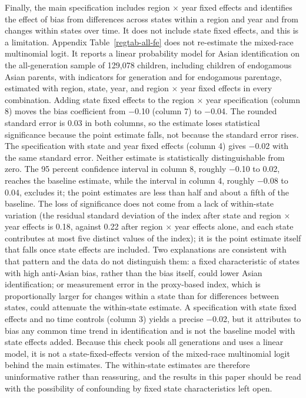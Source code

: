 Finally, the main specification includes region $\times$ year fixed effects and identifies the effect of bias from differences across states within a region and year and from changes within states over time. It does not include state fixed effects, and this is a limitation. Appendix Table~\ref{regtab-all-fe} does not re-estimate the mixed-race multinomial logit. It reports a linear probability model for Asian identification on the all-generation sample of 129{,}078 children, including children of endogamous Asian parents, with indicators for generation and for endogamous parentage, estimated with region, state, year, and region $\times$ year fixed effects in every combination. Adding state fixed effects to the region $\times$ year specification (column 8) moves the bias coefficient from $-$0.10 (column 7) to $-$0.04. The rounded standard error is 0.03 in both columns, so the estimate loses statistical significance because the point estimate falls, not because the standard error rises. The specification with state and year fixed effects (column 4) gives $-$0.02 with the same standard error. Neither estimate is statistically distinguishable from zero. The 95 percent confidence interval in column 8, roughly $-$0.10 to 0.02, reaches the baseline estimate, while the interval in column 4, roughly $-$0.08 to 0.04, excludes it; the point estimates are less than half and about a fifth of the baseline. The loss of significance does not come from a lack of within-state variation (the residual standard deviation of the index after state and region $\times$ year effects is 0.18, against 0.22 after region $\times$ year effects alone, and each state contributes at most five distinct values of the index); it is the point estimate itself that falls once state effects are included. Two explanations are consistent with that pattern and the data do not distinguish them: a fixed characteristic of states with high anti-Asian bias, rather than the bias itself, could lower Asian identification; or measurement error in the proxy-based index, which is proportionally larger for changes within a state than for differences between states, could attenuate the within-state estimate. A specification with state fixed effects and no time controls (column 3) yields a precise $-$0.02, but it attributes to bias any common time trend in identification and is not the baseline model with state effects added. Because this check pools all generations and uses a linear model, it is not a state-fixed-effects version of the mixed-race multinomial logit behind the main estimates. The within-state estimates are therefore uninformative rather than reassuring, and the results in this paper should be read with the possibility of confounding by fixed state characteristics left open.

